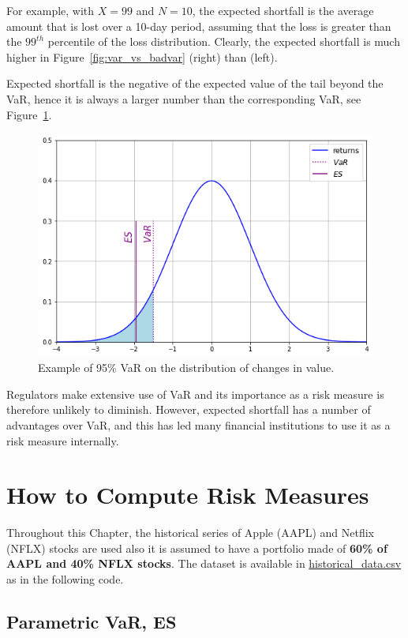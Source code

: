 For example, with $X = 99$ and $N = 10$, the expected shortfall is the average amount that is lost over a 10-day period, assuming that the loss is greater than the $99^{th}$ percentile of the loss distribution.  Clearly, the expected shortfall is much higher in Figure~\ref{fig:var_vs_badvar} (right) than (left). 

Expected shortfall is the negative of the expected value of the tail beyond the VaR, hence it is always a larger number than the corresponding VaR, see Figure~\ref{fig:es_loss}.

\begin{figure}[htb]
\centering
\includegraphics[width=0.6\linewidth]{figures/es}
\caption{Example of 95\% VaR on the distribution of changes in value.}
\label{fig:es_loss}
\end{figure}

Regulators make extensive use of VaR and its importance as a risk measure is therefore unlikely to diminish. However, expected shortfall has a number of advantages over VaR, and this has led many financial institutions to use it as a risk measure internally. 

\section{How to Compute Risk Measures}
\label{how-to-estimate-the-var}

Throughout this Chapter, the historical series of Apple (AAPL) and Netflix (NFLX) stocks are used also it is assumed to have a portfolio made of \textbf{60\% of AAPL and 40\% NFLX stocks}. The dataset is available in \href{https://raw.githubusercontent.com/matteosan1/finance_course/master/input_files/historical_data.csv}{historical\_data.csv} as in the following code.

\subsection{Parametric VaR, ES}

